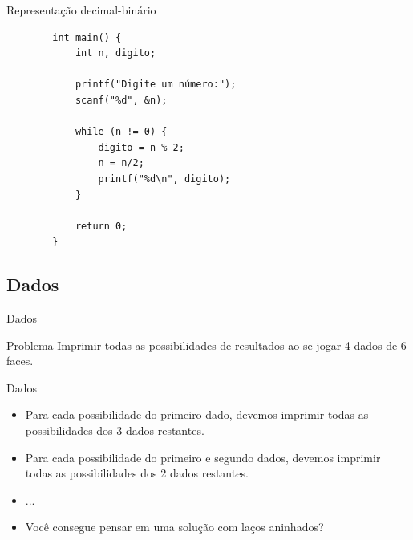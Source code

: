 \documentclass[handout]{beamer}
\begin{document}
\begin{frame}[fragile]{Representação decimal-binário}

    \begin{verbatim}
        int main() {
            int n, digito;
            
            printf("Digite um número:");
            scanf("%d", &n);
            
            while (n != 0) {
                digito = n % 2;
                n = n/2;
                printf("%d\n", digito);
            }

            return 0;
        }
    \end{verbatim}
\end{frame}

\subsection{Dados}%

\begin{frame}[fragile]{Dados}
    \begin{block}{Problema}
        Imprimir todas as possibilidades de resultados ao se jogar 4 dados de 6 faces.
    \end{block}
\end{frame}

\begin{frame}[fragile]{Dados}
    \begin{itemize}[<+->]
        \item Para cada possibilidade do primeiro dado, devemos imprimir todas as possibilidades dos 3 dados restantes.
        \item Para cada possibilidade do primeiro e segundo dados, devemos imprimir todas as possibilidades dos 2 dados restantes.
        \item ...
        \item Você consegue pensar em uma solução com laços aninhados?
    \end{itemize}
\end{frame}
\end{document}
